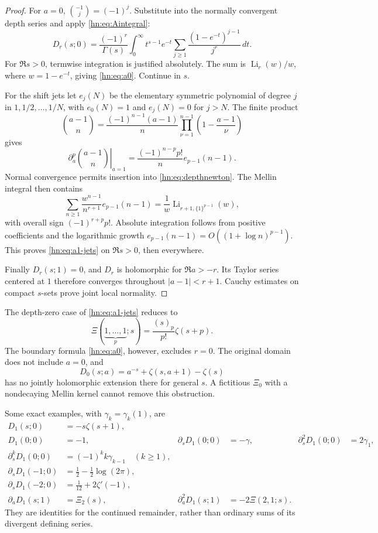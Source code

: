 \begin{proof}
For $a=0$, $\binom{-1}{j}=(-1)^j$. Substitute into the normally
convergent depth series and apply \eqref{hn:eq:Aintegral}:
\[
 D_r(s;0)=\frac{(-1)^r}{\Gamma(s)}\int_0^\infty
     t^{s-1}e^{-t}\sum_{j\ge1}\frac{(1-e^{-t})^{j-1}}{j^r}\,dt.
\]
For $\Re s>0$, termwise integration is justified absolutely.
The sum is $\operatorname{Li}_r(w)/w$, where $w=1-e^{-t}$,
giving \eqref{hn:eq:a0}. Continue in $s$.

For the shift jets let $e_j(N)$ be the elementary symmetric
polynomial of degree $j$ in $1,1/2,\ldots,1/N$, with $e_0(N)=1$
and $e_j(N)=0$ for $j>N$. The finite product
\[
 \binom{a-1}{n}=\frac{(-1)^{n-1}(a-1)}n
          \prod_{\nu=1}^{n-1}\left(1-\frac{a-1}{\nu}\right)
\]
gives
\[
 \left.\partial_a^p\binom{a-1}{n}\right|_{a=1}
      =\frac{(-1)^{n-p}p!}{n}e_{p-1}(n-1).
\]
Normal convergence permits insertion into
\eqref{hn:eq:depthnewton}. The Mellin integral then contains
\[
 \sum_{n\ge1}\frac{w^{n-1}}{n^{r+1}}e_{p-1}(n-1)
 =\frac1w\operatorname{Li}_{r+1,\{1\}^{p-1}}(w),
\]
with overall sign $(-1)^{r+p}p!$. Absolute integration follows
from positive coefficients and the logarithmic growth
$e_{p-1}(n-1)=O((1+\log n)^{p-1})$.
This proves \eqref{hn:eq:a1-jets} on $\Re s>0$, then everywhere.

Finally $D_r(s;1)=0$, and $D_r$ is holomorphic for $\Re a>-r$.
Its Taylor series centered at $1$ therefore converges throughout
$|a-1|<r+1$. Cauchy estimates on compact $s$-sets prove joint
local normality.
\end{proof}

The depth-zero case of \eqref{hn:eq:a1-jets} reduces to
\[
 \Xi(\underbrace{1,\ldots,1}_{p};s)
        =\frac{(s)_p}{p!}\zeta(s+p).
\]
The boundary formula \eqref{hn:eq:a0}, however, excludes $r=0$.
The original domain does not include $a=0$, and
\[
 D_0(s;a)=a^{-s}+\zeta(s,a+1)-\zeta(s)
\]
has no jointly holomorphic extension there for general $s$.
A fictitious $\Xi_0$ with a nondecaying Mellin kernel cannot
remove this obstruction.

Some exact examples, with $\gamma_k=\gamma_k(1)$, are
\begin{align*}
 D_1(s;0)&=-s\zeta(s+1),\\
 D_1(0;0)&=-1,&
 \partial_sD_1(0;0)&=-\gamma,&
 \partial_s^2D_1(0;0)&=2\gamma_1,\\
 \partial_s^kD_1(0;0)&=(-1)^k k\gamma_{k-1}\quad(k\ge1),\\
 \partial_sD_1(-1;0)&=\frac12-\frac12\log(2\pi),\\
 \partial_sD_1(-2;0)&=\frac1{12}+2\zeta'(-1),\\
 \partial_aD_1(s;1)&=\Xi_2(s),&
 \partial_a^2D_1(s;1)&=-2\Xi(2,1;s).
\end{align*}
They are identities for the continued remainder, rather than
ordinary sums of its divergent defining series.

